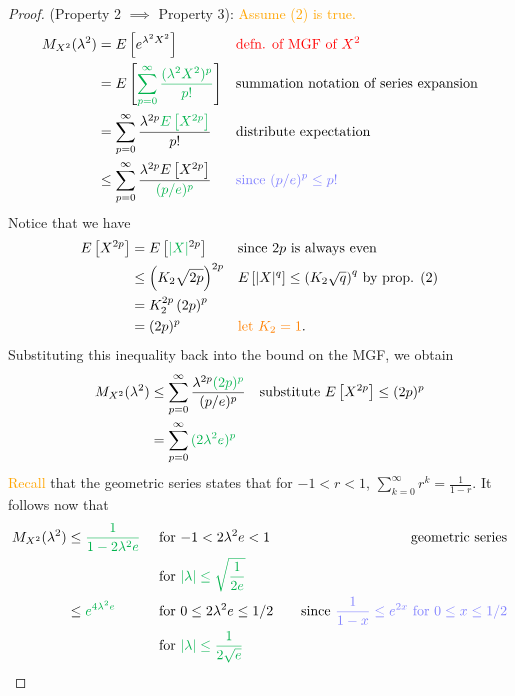 \begin{proof}
(Property 2 $\implies$ Property 3): \textcolor{orange}{Assume (2) is true.}
\begin{align*}
M_{X^2}(\lambda^2) &= \Expect{e^{\lambda^2 X^2}} && 
    \text{\textcolor{red}{defn. of MGF of $X^2$} } \\ 
&= \Expect{\textcolor{\dgreen}{\sum_{p=0}^{\infty} \frac{(\lambda^2 X^2)^p}{p!}}} && 
    \text{summation notation of series expansion} \\ 
&= \sum_{p=0}^{\infty} \frac{\lambda^{2p} \textcolor{\dgreen}{\Expect{X^{2p}}}}{p!} &&
    \text{distribute expectation} \\ 
&\leq \sum_{p=0}^{\infty} \frac{ \lambda^{2p} \Expect{X^{2p} } }{\textcolor{\dgreen}{(p/e)^p}} &&
    \text{\textcolor{blue!50!white}{since $(p/e)^p \leq p!$}} 
\end{align*}
Notice that we have 
\begin{align*}
    \Expect{X^{2p}} &= \Expect{\textcolor{\dgreen}{|X|}^{2p}} && 
        \text{since $2p$ is always even} \\ 
    &\leq \left(K_2 \sqrt{2p} \right)^{2p} && 
        \text{$\Expect{|X|^q} \leq \left(K_2 \sqrt{q}\right)^q$ by prop. (2)} \\ 
    &= K_2^{2p} \left(2p \right)^p && 
        \text{} \\ 
    &= (2p)^p && \text{\textcolor{orange}{let $K_2 = 1$}}. 
\end{align*}
Substituting this inequality back into the bound on the MGF, we obtain 
\begin{align*}
    M_{X^2}(\lambda^2) &\leq \sum_{p=0}^{\infty} \frac{ \lambda^{2p} \textcolor{\dgreen}{(2p)^p} }{ (p/e)^p } && 
        \text{substitute $\Expect{X^{2p}} \leq (2p)^p$} \\ 
    &= \sum_{p=0}^{\infty} \textcolor{\dgreen}{(2\lambda^2 e)^p} && 
        \text{} 
\end{align*}
\textcolor{orange}{Recall} that the geometric series states that for $-1 < r < 1$, $\sum_{k=0}^{\infty} r^k = \frac{1}{1-r}.$ It follows now that 
\begin{align*}
    M_{X^2}(\lambda^2) &\leq \textcolor{\dgreen}{\frac{1}{1 - 2\lambda^2 e}} &&\text{ for $-1 < 2\lambda^2 e < 1$} &&& \text{geometric series} \\ 
    & &&\text{ for } \textcolor{\dgreen}{|\lambda| \leq \sqrt{\frac{1}{2e}}} &&&  \\
    &\leq \textcolor{\dgreen}{e^{4 \lambda^2 e}} &&\text{ for $0 \leq 2\lambda^2 e \leq 1/2$} &&& 
        \text{since \textcolor{blue!50!white}{$\frac{1}{1-x} \leq e^{2x}$ for $0 \leq x \leq 1/2$}} \\ 
    & && \text{ for } \textcolor{\dgreen}{|\lambda| \leq \frac{1}{2 \sqrt{e}}}
\end{align*}
\end{proof}

